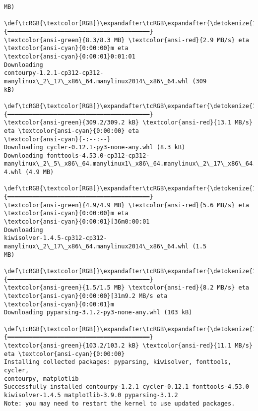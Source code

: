 \documentclass[11pt]{article}
\begin{document}
\begin{Verbatim}[commandchars=\\\{\}]
MB)
   \def\tcRGB{\textcolor[RGB]}\expandafter\tcRGB\expandafter{\detokenize{114,156,31}}{━━━━━━━━━━━━━━━━━━━━━━━━━━━━━━━━━━━━━━━━}
\textcolor{ansi-green}{8.3/8.3 MB} \textcolor{ansi-red}{2.9 MB/s} eta \textcolor{ansi-cyan}{0:00:00}m eta
\textcolor{ansi-cyan}{0:00:01}0:01:01
Downloading
contourpy-1.2.1-cp312-cp312-manylinux\_2\_17\_x86\_64.manylinux2014\_x86\_64.whl (309
kB)
   \def\tcRGB{\textcolor[RGB]}\expandafter\tcRGB\expandafter{\detokenize{114,156,31}}{━━━━━━━━━━━━━━━━━━━━━━━━━━━━━━━━━━━━━━━━}
\textcolor{ansi-green}{309.2/309.2 kB} \textcolor{ansi-red}{13.1 MB/s} eta \textcolor{ansi-cyan}{0:00:00} eta
\textcolor{ansi-cyan}{-:--:--}
Downloading cycler-0.12.1-py3-none-any.whl (8.3 kB)
Downloading fonttools-4.53.0-cp312-cp312-
manylinux\_2\_5\_x86\_64.manylinux1\_x86\_64.manylinux\_2\_17\_x86\_64.manylinux2014\_x86\_6
4.whl (4.9 MB)
   \def\tcRGB{\textcolor[RGB]}\expandafter\tcRGB\expandafter{\detokenize{114,156,31}}{━━━━━━━━━━━━━━━━━━━━━━━━━━━━━━━━━━━━━━━━}
\textcolor{ansi-green}{4.9/4.9 MB} \textcolor{ansi-red}{5.6 MB/s} eta \textcolor{ansi-cyan}{0:00:00}m eta
\textcolor{ansi-cyan}{0:00:01}[36m0:00:01
Downloading
kiwisolver-1.4.5-cp312-cp312-manylinux\_2\_17\_x86\_64.manylinux2014\_x86\_64.whl (1.5
MB)
   \def\tcRGB{\textcolor[RGB]}\expandafter\tcRGB\expandafter{\detokenize{114,156,31}}{━━━━━━━━━━━━━━━━━━━━━━━━━━━━━━━━━━━━━━━━}
\textcolor{ansi-green}{1.5/1.5 MB} \textcolor{ansi-red}{8.2 MB/s} eta \textcolor{ansi-cyan}{0:00:00}[31m9.2 MB/s eta
\textcolor{ansi-cyan}{0:00:01}m
Downloading pyparsing-3.1.2-py3-none-any.whl (103 kB)
   \def\tcRGB{\textcolor[RGB]}\expandafter\tcRGB\expandafter{\detokenize{114,156,31}}{━━━━━━━━━━━━━━━━━━━━━━━━━━━━━━━━━━━━━━━━}
\textcolor{ansi-green}{103.2/103.2 kB} \textcolor{ansi-red}{11.1 MB/s} eta \textcolor{ansi-cyan}{0:00:00}
Installing collected packages: pyparsing, kiwisolver, fonttools, cycler,
contourpy, matplotlib
Successfully installed contourpy-1.2.1 cycler-0.12.1 fonttools-4.53.0
kiwisolver-1.4.5 matplotlib-3.9.0 pyparsing-3.1.2
Note: you may need to restart the kernel to use updated packages.
    \end{Verbatim}
\end{document}
